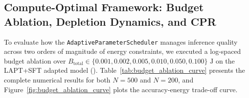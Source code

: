 \documentclass{interact}
\begin{document}
\subsection{Compute-Optimal Framework: Budget Ablation, Depletion Dynamics, and CPR}
\label{subsec:budget_ablation_results}

To evaluate how the \texttt{AdaptiveParameterScheduler} manages inference quality across two orders of magnitude of energy constraints, we executed a log-spaced budget ablation over $B_{\text{total}} \in \{0.001, 0.002, 0.005, 0.010, 0.050, 0.100\}\text{ J}$ on the LAPT+SFT adapted model (). Table~\ref{tab:budget_ablation_curve} presents the complete numerical results for both $N=500$ and $N=200$, and Figure~\ref{fig:budget_ablation_curve} plots the accuracy-energy trade-off curve.
\end{document}
